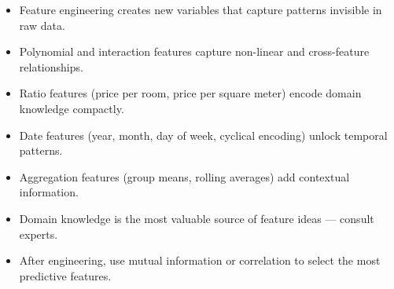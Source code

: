 \begin{itemize}
  \item Feature engineering creates new variables that capture patterns invisible in raw data.
  \item Polynomial and interaction features capture non-linear and cross-feature relationships.
  \item Ratio features (price per room, price per square meter) encode domain knowledge compactly.
  \item Date features (year, month, day of week, cyclical encoding) unlock temporal patterns.
  \item Aggregation features (group means, rolling averages) add contextual information.
  \item Domain knowledge is the most valuable source of feature ideas --- consult experts.
  \item After engineering, use mutual information or correlation to select the most predictive features.
\end{itemize}
